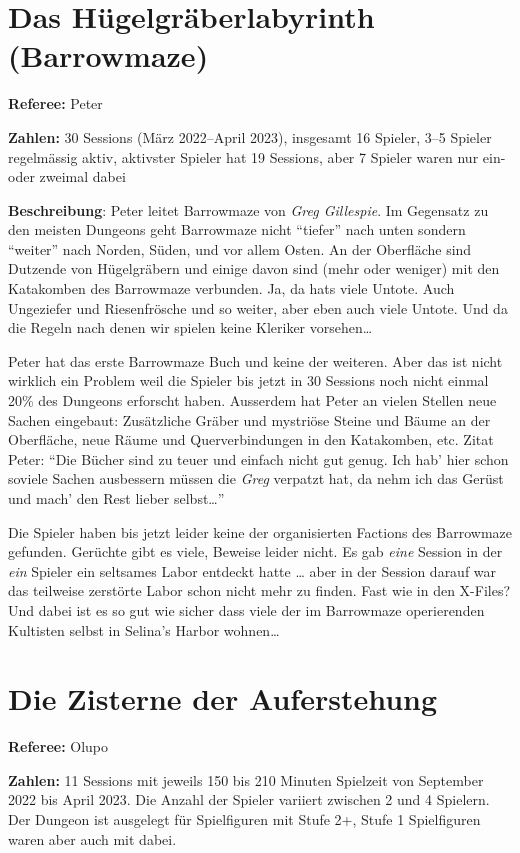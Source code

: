\documentclass[11pt]{wbzine}
\begin{document}
\begin{multicols}{2}
\section{Das Hügelgräberlabyrinth (Barrowmaze)}

\textbf{Referee:} Peter

\textbf{Zahlen:} 30 Sessions (März 2022--April 2023),
insgesamt 16 Spieler,
3--5 Spieler regelmässig aktiv,
aktivster Spieler hat 19 Sessions,
aber 7 Spieler waren nur ein- oder zweimal dabei

\textbf{Beschreibung}: Peter leitet Barrowmaze von \textit{Greg Gillespie}.
Im Gegensatz zu den meisten Dungeons geht Barrowmaze nicht ``tiefer'' nach
unten sondern ``weiter'' nach Norden, Süden, und vor allem Osten. An der
Oberfläche sind Dutzende von Hügelgräbern und einige davon sind (mehr oder
weniger) mit den Katakomben des Barrowmaze verbunden. Ja, da hats viele
Untote. Auch Ungeziefer und Riesenfrösche und so weiter, aber eben auch
viele Untote. Und da die Regeln nach denen wir spielen keine Kleriker
vorsehen\dots{}

Peter hat das erste Barrowmaze Buch und keine der weiteren. Aber das ist
nicht wirklich ein Problem weil die Spieler bis jetzt in 30 Sessions noch
nicht einmal 20\% des Dungeons erforscht haben. Ausserdem hat Peter an
vielen Stellen neue Sachen eingebaut: Zusätzliche Gräber und mystriöse
Steine und Bäume an der Oberfläche, neue Räume und Querverbindungen in
den Katakomben, etc. Zitat Peter: ``Die Bücher sind zu teuer und einfach
nicht gut genug. Ich hab' hier schon soviele Sachen ausbessern müssen die
\textit{Greg} verpatzt hat, da nehm ich das Gerüst und mach' den Rest
lieber selbst\dots{}''

Die Spieler haben bis jetzt leider keine der organisierten Factions des
Barrowmaze gefunden. Gerüchte gibt es viele, Beweise leider nicht. Es gab
\emph{eine} Session in der \emph{ein} Spieler ein seltsames Labor entdeckt
hatte \dots{} aber in der Session darauf war das teilweise zerstörte Labor
schon nicht mehr zu finden. Fast wie in den X-Files? Und dabei ist es so
gut wie sicher dass viele der im Barrowmaze operierenden Kultisten selbst
in Selina's Harbor wohnen\dots{}

\section{Die Zisterne der Auferstehung}

\textbf{Referee:} Olupo

\textbf{Zahlen:} 11 Sessions mit jeweils 150 bis 210 Minuten Spielzeit von
September 2022 bis April 2023. Die Anzahl der Spieler variiert zwischen
2 und 4 Spielern. Der Dungeon ist ausgelegt für Spielfiguren mit Stufe
2+, Stufe 1 Spielfiguren waren aber auch mit dabei.


\end{multicols}
\end{document}

